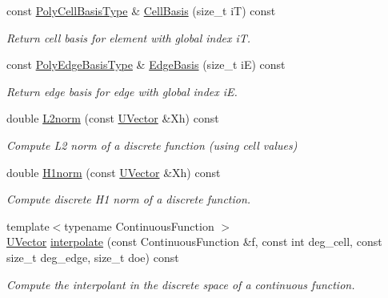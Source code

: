 \begin{DoxyCompactItemize}
\mbox{\label{classHArDCore2D_1_1HybridCore_afb3e4d056b781b2fff5e46466d47e0f3}} 
const \hyperlink{classHArDCore2D_1_1HybridCore_a66e8eccfa5bfc2788b2aec903bd64d4a}{Poly\+Cell\+Basis\+Type} \& \hyperlink{classHArDCore2D_1_1HybridCore_afb3e4d056b781b2fff5e46466d47e0f3}{Cell\+Basis} (size\+\_\+t iT) const
\begin{DoxyCompactList}\small\item\em Return cell basis for element with global index iT. \end{DoxyCompactList}\item 
\mbox{\label{classHArDCore2D_1_1HybridCore_a9394b577ae67c9aa2289095bfedc38e2}} 
const \hyperlink{classHArDCore2D_1_1HybridCore_a76550d672e82b1b9e49ea90054b8cc6d}{Poly\+Edge\+Basis\+Type} \& \hyperlink{classHArDCore2D_1_1HybridCore_a9394b577ae67c9aa2289095bfedc38e2}{Edge\+Basis} (size\+\_\+t iE) const
\begin{DoxyCompactList}\small\item\em Return edge basis for edge with global index iE. \end{DoxyCompactList}\item 
double \hyperlink{classHArDCore2D_1_1HybridCore_ab37ab89bf946e237821dd978f475b7c8}{L2norm} (const \hyperlink{classHArDCore2D_1_1UVector}{U\+Vector} \&Xh) const
\begin{DoxyCompactList}\small\item\em Compute L2 norm of a discrete function (using cell values) \end{DoxyCompactList}\item 
double \hyperlink{classHArDCore2D_1_1HybridCore_ad6672e0691764ec5752eb1a9a7257792}{H1norm} (const \hyperlink{classHArDCore2D_1_1UVector}{U\+Vector} \&Xh) const
\begin{DoxyCompactList}\small\item\em Compute discrete H1 norm of a discrete function. \end{DoxyCompactList}\item 
{\footnotesize template$<$typename Continuous\+Function $>$ }\\\hyperlink{classHArDCore2D_1_1UVector}{U\+Vector} \hyperlink{group__HybridCore_ga7d6af50952aa59143ac364dd1dc4118e}{interpolate} (const Continuous\+Function \&f, const int deg\+\_\+cell, const size\+\_\+t deg\+\_\+edge, size\+\_\+t doe) const
\begin{DoxyCompactList}\small\item\em Compute the interpolant in the discrete space of a continuous function. \end{DoxyCompactList}\item 

\end{DoxyCompactItemize}
